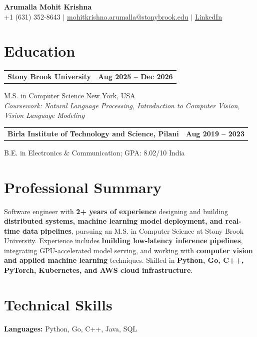 \documentclass[letterpaper,10pt]{article}
\makeatletter
\newcommand{\entry}[2]{%
  \noindent
  \begin{tabularx}{\linewidth}
    {@{}>{\raggedright\arraybackslash}X@{\hspace{6pt}}r@{}}
    \textbf{#1} & #2
  \end{tabularx}\par
}
\makeatother
\begin{document}
\begin{center}
    {\LARGE\bfseries Arumalla Mohit Krishna}\\[3pt]
    +1 (631) 352-8643 $|$
    \href{mailto:mohitkrishna.arumalla@stonybrook.edu}
    {mohitkrishna.arumalla@stonybrook.edu} $|$
    \href{https://linkedin.com/in/mohit-krishna-arumalla}
    {LinkedIn}
\end{center}
\vspace{-8pt}

\section{Education}

\entry
  {\textbf{Stony Brook University}}
  {\textbf{Aug 2025 -- Dec 2026}}

M.S. in Computer Science \hfill New York, USA\\
\textit{
Coursework: Natural Language Processing,
Introduction to Computer Vision, Vision Language Modeling
}
\vspace{3pt}

\entry
  {\textbf{Birla Institute of Technology and Science, Pilani}}
  {\textbf{Aug 2019 -- 2023}}

B.E. in Electronics \& Communication; GPA: 8.02/10 \hfill India
\section{Professional Summary}

Software engineer with \textbf{2+ years of experience} designing and building \textbf{distributed systems, machine learning model deployment, and real-time data pipelines}, pursuing an M.S. in Computer Science at Stony Brook University. Experience includes \textbf{building low-latency inference pipelines}, integrating GPU-accelerated model serving, and working with \textbf{computer vision and applied machine learning} techniques. Skilled in \textbf{Python, Go, C++, PyTorch, Kubernetes, and AWS cloud infrastructure}.

\section{Technical Skills}

\textbf{Languages:}
Python, Go, C++, Java, SQL\\
\end{document}
